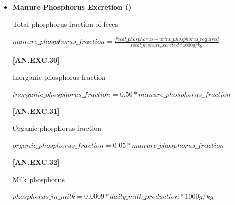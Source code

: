 \documentclass{article}
\begin{document}
\begin{refsection}
\begin{itemize}
            {\raggedleft \textbf{[AN.EXC.6]}\par}
            \vspace{0.5cm}

        \item \textbf{Manure Phosphorus Excretion ()}

Total phosphorus fraction of feces
        \vspace{0.5cm}
    
    \begin{center}
        \(manure\_phosphorus\_fraction = \frac{fecal\_phosphorus + urine\_phosphorus\_required}{total\_manure_excreted * 1000 g/kg}\)
    \end{center}
        \vspace{0.5cm} 
    
            {\raggedleft \textbf{[AN.EXC.30]}\par}
            \vspace{0.5cm}

Inorganic phosphorus fraction 
        \vspace{0.5cm}
    
    \begin{center}
        \(inorganic\_phosphorus\_fraction = 0.50 * manure\_phosphorus\_fraction\)
    \end{center}
        \vspace{0.5cm} 
    
            {\raggedleft \textbf{[AN.EXC.31]}\par}
            \vspace{0.5cm}

Organic phosphorus fraction 
        \vspace{0.5cm}
    
    \begin{center}
        \(organic\_phosphorus\_fraction = 0.05 * manure\_phosphorus\_fraction \)
    \end{center}
        \vspace{0.5cm} 
    
            {\raggedleft \textbf{[AN.EXC.32]}\par}
            \vspace{0.5cm}
            
Milk phosphorus
        \vspace{0.5cm}
    
    \begin{center}
        \(phosphorus\_in\_milk =0.0009 * daily\_milk\_production * 1000g/kg\)
    \end{center}
        \vspace{0.5cm} 
    

\end{itemize}
\end{refsection}
\end{document}
